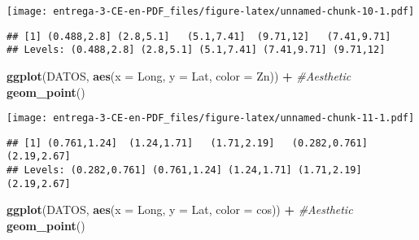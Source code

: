 \documentclass[
]{article}
\newenvironment{Shaded}{\begin{snugshade}}{\end{snugshade}}
\newcommand{\CommentTok}[1]{\textcolor[rgb]{0.56,0.35,0.01}{\textit{#1}}}
\newcommand{\DataTypeTok}[1]{\textcolor[rgb]{0.13,0.29,0.53}{#1}}
\newcommand{\DecValTok}[1]{\textcolor[rgb]{0.00,0.00,0.81}{#1}}
\newcommand{\KeywordTok}[1]{\textcolor[rgb]{0.13,0.29,0.53}{\textbf{#1}}}
\newcommand{\NormalTok}[1]{#1}
\newcommand{\OperatorTok}[1]{\textcolor[rgb]{0.81,0.36,0.00}{\textbf{#1}}}
\newcommand{\StringTok}[1]{\textcolor[rgb]{0.31,0.60,0.02}{#1}}
\begin{document}
\texttt{[image: entrega-3-CE-en-PDF\_files/figure-latex/unnamed-chunk-10-1.pdf]}

\begin{Shaded}
\end{Shaded}

\begin{verbatim}
## [1] (0.488,2.8] (2.8,5.1]   (5.1,7.41]  (9.71,12]   (7.41,9.71]
## Levels: (0.488,2.8] (2.8,5.1] (5.1,7.41] (7.41,9.71] (9.71,12]
\end{verbatim}

\begin{Shaded}
\begin{Highlighting}[]
\KeywordTok{ggplot}\NormalTok{(DATOS, }\KeywordTok{aes}\NormalTok{(}\DataTypeTok{x =}\NormalTok{ Long, }\DataTypeTok{y =}\NormalTok{ Lat, }\DataTypeTok{color =}\NormalTok{ Zn)) }\OperatorTok{+}\StringTok{ }\CommentTok{#Aesthetic}
\StringTok{  }\KeywordTok{geom_point}\NormalTok{()}
\end{Highlighting}
\end{Shaded}

\texttt{[image: entrega-3-CE-en-PDF\_files/figure-latex/unnamed-chunk-11-1.pdf]}

\begin{Shaded}
\end{Shaded}

\begin{verbatim}
## [1] (0.761,1.24]  (1.24,1.71]   (1.71,2.19]   (0.282,0.761] (2.19,2.67]  
## Levels: (0.282,0.761] (0.761,1.24] (1.24,1.71] (1.71,2.19] (2.19,2.67]
\end{verbatim}

\begin{Shaded}
\begin{Highlighting}[]
\KeywordTok{ggplot}\NormalTok{(DATOS, }\KeywordTok{aes}\NormalTok{(}\DataTypeTok{x =}\NormalTok{ Long, }\DataTypeTok{y =}\NormalTok{ Lat, }\DataTypeTok{color =}\NormalTok{ cos)) }\OperatorTok{+}\StringTok{ }\CommentTok{#Aesthetic}
\StringTok{  }\KeywordTok{geom_point}\NormalTok{()}
\end{Highlighting}
\end{Shaded}
\end{document}

